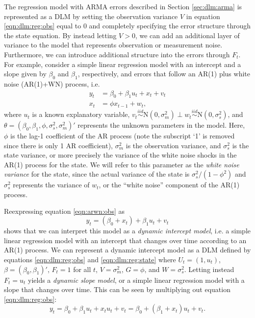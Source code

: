 The regression model with ARMA errors described in Section \ref{sec:dlm:arma} is represented as a DLM by setting the observation variance $V$ in equation \eqref{eqn:dlm:reg:obs} equal to 0 and completely specifying the error structure through the state equation. By instead letting $V > 0$, we can add an additional layer of variance to the model that represents observation or measurement noise. Furthermore, we can introduce additional structure into the errors through $F_t$. For example, consider a simple linear regression model with an intercept and a slope given by $\beta_0$ and $\beta_1$, respectively, and errors that follow an AR(1) plus white noise (AR(1)+WN) process, i.e.
\begin{align}
y_t &= \beta_0 + \beta_1u_t + x_t + v_t \label{eqn:arwn:obs} \\
x_t &= \phi x_{t-1} + w_t, \label{eqn:arwn:state}
\end{align}
where $u_t$ is a known explanatory variable, $v_t \stackrel{iid}{\sim} \mbox{N}(0, \sigma^2_m) \perp w_t \stackrel{iid}{\sim} \mbox{N}(0, \sigma^2_s)$, and $\theta = (\beta_0,\beta_1,\phi,\sigma^2_s,\sigma^2_m)'$ represents the unknown parameters in the model. Here, $\phi$ is the lag-1 coefficient of the AR process (note the subscript `1' is removed since there is only 1 AR coefficient), $\sigma^2_m$ is the observation variance, and $\sigma^2_s$ is the state variance, or more precisely the variance of the white noise shocks in the AR(1) process for the state. We will refer to this parameter as the \emph{white noise variance} for the state, since the actual variance of the state is $\sigma^2_s / (1 - \phi^2)$ and $\sigma^2_s$ represents the variance of $w_t$, or the ``white noise'' component of the AR(1) process.

Reexpressing equation \eqref{eqn:arwn:obs} as
\begin{equation}
y_t = (\beta_0 + x_t) + \beta_1u_t + v_t \label{eqn:arwn:dynint}
\end{equation}
shows that we can interpret this model as a \emph{dynamic intercept model}, i.e. a simple linear regression model with an intercept that changes over time according to an AR(1) process. We can represent a dynamic intercept model as a DLM defined by equations \eqref{eqn:dlm:reg:obs} and \eqref{eqn:dlm:reg:state} where $U_t = (1, u_t)$, $\beta = (\beta_0, \beta_1)'$, $F_t = 1$ for all $t$, $V = \sigma^2_m$, $G = \phi$, and $W = \sigma^2_s$. Letting instead $F_t = u_t$ yields a \emph{dynamic slope model}, or a simple linear regression model with a slope that changes over time. This can be seen by multiplying out equation \eqref{eqn:dlm:reg:obs}:
\begin{equation}
y_t = \beta_0 + \beta_1u_t + x_tu_t + v_t = \beta_0 + (\beta_1 + x_t)u_t + v_t. \label{eqn:arwn:dynslo}
\end{equation}

